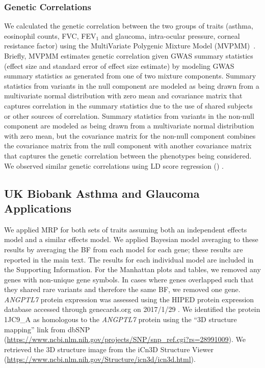 \subsubsection*{Genetic Correlations}
We calculated the genetic correlation between the two groups of traits (asthma, eosinophil counts, FVC, FEV$_1$ and glaucoma, intra-ocular pressure, corneal resistance factor) using the MultiVariate Polygenic Mixture Model (MVPMM)~\cite{DeBoever2017}. Briefly, MVPMM estimates genetic correlation given GWAS summary statistics (effect size and standard error of effect size estimate) by modeling GWAS summary statistics as generated from one of two mixture components. Summary statistics from variants in the null component are modeled as being drawn from a multivariate normal distribution with zero mean and covariance matrix that captures correlation in the summary statistics due to the use of shared subjects or other sources of correlation. Summary statistics from variants in the non-null component are modeled as being drawn from a multivariate normal distribution with zero mean, but the covariance matrix for the non-null component combines the covariance matrix from the null component with another covariance matrix that captures the genetic correlation between the phenotypes being considered. We observed similar genetic correlations using LD score regression () \cite{gencorr2015}.

\subsection*{UK Biobank Asthma and Glaucoma Applications}
We applied MRP for both sets of traits assuming both an independent effects model and a similar effects model. We applied Bayesian model averaging to these results by averaging the BF from each model for each gene; these results are reported in the main text. The results for each individual model are included in the Supporting Information. For the Manhattan plots and tables, we removed any genes with non-unique gene symbols. In cases where genes overlapped such that they shared rare variants and therefore the same BF, we removed one gene. \textit{ANGPTL7} protein expression was assessed using the HIPED protein expression database accessed through genecards.org on 2017/1/29 \cite{Fishilevich:2016hx}. We identified the protein 1JC9\_A as homologous to the \textit{ANGPTL7} protein using the ``3D structure mapping'' link from dbSNP (\url{https://www.ncbi.nlm.nih.gov/projects/SNP/snp_ref.cgi?rs=28991009}). We retrieved the 3D structure image from the iCn3D Structure Viewer (\url{https://www.ncbi.nlm.nih.gov/Structure/icn3d/icn3d.html}). 

